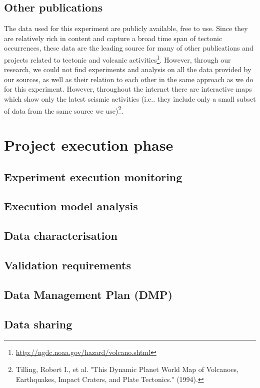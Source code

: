\documentclass[12pt, a4paper]{article}
\begin{document}
\subsection{Other publications}
The data used for this experiment are publicly available, free to use. Since they are relatively rich in content and capture a broad time span of tectonic occurrences, these data are the leading source for many of other publications and projects related to tectonic and volcanic activities\footnote{\url{http://ngdc.noaa.gov/hazard/volcano.shtml}}. However, through our research, we could not find experiments and analysis on all the data provided by our sources, as well as their relation to each other in the same approach as we do for this experiment. However, throughout the internet there are interactive maps which show only the latest seismic activities (i.e.. they include only a small subset of data from the same source we use)\footnote{Tilling, Robert I., et al. "This Dynamic Planet World Map of Volcanoes, Earthquakes, Impact Craters, and Plate Tectonics." (1994).}.


\section{Project execution phase}
\subsection{Experiment execution monitoring}
\subsection{Execution model analysis}
\subsection{Data characterisation}
\subsection{Validation requirements}
\subsection{Data Management Plan (DMP)}
\subsection{Data sharing}
\end{document}
